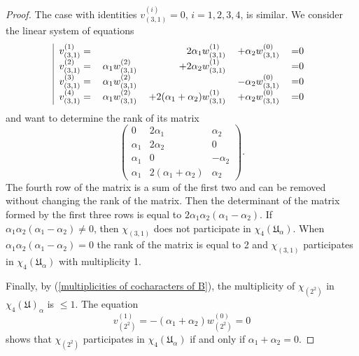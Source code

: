 \documentclass[10pt,a4paper]{amsart}
\begin{document}
\begin{proof}
The case with identities $v^{(i)}_{(3,1)}=0$, $i=1,2,3,4$, is similar. We consider the linear system of equations
\begin{equation}
\text{
\begin{tabular}{|rrrrl}\label{identities from (3) to (3,1)}
$v^{(1)}_{(3,1)}=$&&$2\alpha_1w_{(3,1)}^{(1)}$&$+\alpha_2w_{(3,1)}^{(0)}$&=0\\
$v^{(2)}_{(3,1)}=$&$\alpha_1w_{(3,1)}^{(2)}$&$+2\alpha_2w_{(3,1)}^{(1)}$&&=0\\
$v^{(3)}_{(3,1)}=$&$\alpha_1w_{(3,1)}^{(2)}$&&$-\alpha_2w_{(3,1)}^{(0)}$&=0\\
$v^{(4)}_{(3,1)}=$&$\alpha_1w_{(3,1)}^{(2)}$&$+2(\alpha_1+\alpha_2)w_{(3,1)}^{(1)}$&$+\alpha_2w_{(3,1)}^{(0)}$&=0\\
\end{tabular}
}
\end{equation}
and want to determine the rank of its matrix
\[
\left(\begin{matrix}
0&2\alpha_1&\alpha_2\\
\alpha_1&2\alpha_2&0\\
\alpha_1&0&-\alpha_2\\
\alpha_1&2(\alpha_1+\alpha_2)&\alpha_2
\end{matrix}\right).
\]
The fourth row of the matrix is a sum of the first two and can be removed without changing the rank of the matrix.
Then the determinant of the matrix formed by the first three rows is equal to $2\alpha_1\alpha_2(\alpha_1-\alpha_2)$.
If $\alpha_1\alpha_2(\alpha_1-\alpha_2)\not=0$, then $\chi_{(3,1)}$ does not participate in $\chi_4({\mathfrak U}_{\alpha})$.
When $\alpha_1\alpha_2(\alpha_1-\alpha_2)=0$ the rank of the matrix is equal to 2 and
$\chi_{(3,1)}$ participates in $\chi_4({\mathfrak U}_{\alpha})$ with multiplicity 1.

Finally, by (\ref{multiplicities of cocharacters of B}), the multiplicity of $\chi_{(2^2)}$ in $\chi_4({\mathfrak U})_{\alpha}$
is $\leq 1$. The equation
\[
v^{(1)}_{(2^2)}=-(\alpha_1+\alpha_2)w_{(2^2)}^{(0)}=0
\]
shows that $\chi_{(2^2)}$ participates in $\chi_4({\mathfrak U}_{\alpha})$ if and only if $\alpha_1+\alpha_2=0$.
\end{proof}
\end{document}
